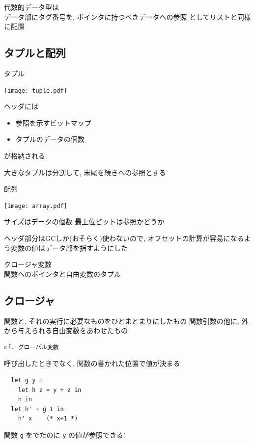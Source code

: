 \documentclass[papersize,30pt,slide]{jsarticle}
\begin{document}
\vspace{1em}

代数的データ型は \\
データ部にタグ番号を, ポインタに持つべきデータへの参照
としてリストと同様に配置

\newpage
\subsection{タプルと配列}
タプル

\texttt{[image: tuple.pdf]}

ヘッダには
\begin{itemize}
\item 参照を示すビットマップ
\item タプルのデータの個数
\end{itemize}
が格納される

大きなタプルは分割して, 末尾を続きへの参照とする

\newpage

配列

\texttt{[image: array.pdf]}

サイズはデータの個数 最上位ビットは参照かどうか

\vspace{1em}

ヘッダ部分はGCしか(おそらく)使わないので, オフセットの計算が容易になるよう変数の値はデータ部を指すようにした

\vspace{1em}

クロージャ変数 \\
関数へのポインタと自由変数のタプル

\newpage
\subsection{クロージャ}
関数と, それの実行に必要なものをひとまとまりにしたもの
関数引数の他に, 外から与えられる自由変数をあわせたもの

\begin{verbatim}
cf. グローバル変数
\end{verbatim}
呼び出したときでなく, 関数の書かれた位置で値が決まる

\begin{lstlisting}
  let g y =
    let h z = y + z in
    h in
  let h' = g 1 in
    h' x    (* x+1 *)
\end{lstlisting}
関数 \lstinline|g| をでたのに \lstinline|y| の値が参照できる!
\end{document}
